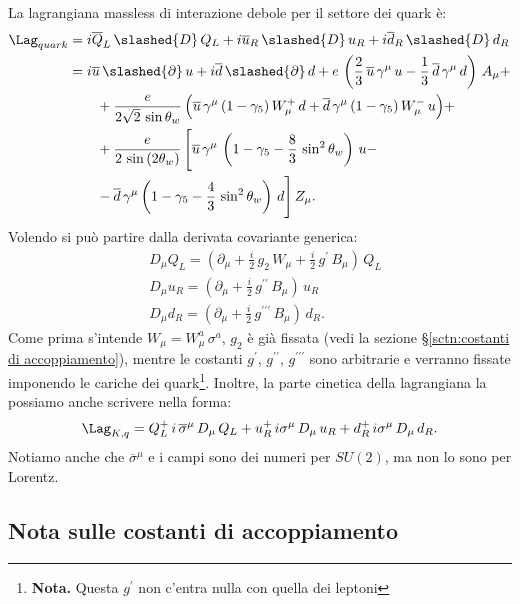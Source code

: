 La lagrangiana massless di interazione debole per il settore dei quark è:
\begin{align}
    \Lag_{quark} &= i\overline{Q}_L\, \slashed{D}\, Q_L + i\overline{u}_R\, \slashed{D}\, u_R + i\overline{d}_R\, \slashed{D}\, d_R \\
    &= i\overline{u}\, \slashed{\partial}\, u + i\overline{d}\, \slashed{\partial}\, d + e\, \left( \frac{2}{3}\, \overline{u}\, \gamma^\mu\, u - \frac{1}{3}\, \overline{d}\, \gamma^\mu\, d \right)\, A_\mu + \notag \\
    &\qquad + \frac{e}{2\sqrt{2}\, \sin\theta_w}\, \Big( \overline{u}\, \gamma^\mu\, (1-\gamma_5)\, W_\mu^+\, d + \overline{d}\, \gamma^\mu\, (1-\gamma_5)\, W_\mu^-\, u \Big) + \notag \\
    &\qquad + \frac{e}{2\, \sin{(2\theta_w)}}\, \Bigg[ \overline{u}\, \gamma^\mu\, \left( 1 - \gamma_5 - \frac{8}{3}\, \sin^2\theta_w \right)\, u - \notag \\
    &\qquad - \overline{d}\, \gamma^\mu\left( 1 - \gamma_5 - \frac{4}{3}\, \sin^2\theta_w\right)\, d \Bigg]\, Z_\mu.
\end{align}
Volendo si può partire dalla derivata covariante generica:
\begin{align}
    &D_\mu Q_L = \left( \partial_\mu + \frac{i}{2}\, g_2\, W_\mu + \frac{i}{2}\, g^\prime\, B_\mu \right)\, Q_L \\
    &D_\mu u_R = \left( \partial_\mu + \frac{i}{2}\, g^{\prime\prime}\, B_\mu \right)\, u_R \\
    &D_\mu d_R = \left( \partial_\mu + \frac{i}{2}\, g^{\prime\prime\prime}\, B_\mu \right)\, d_R.
\end{align}
Come prima s'intende $W_\mu = W_\mu^a\, \sigma^a$, $g_2$ è già fissata (vedi la sezione \S\ref{sctn:costanti di accoppiamento}), mentre le costanti $g^\prime$, $g^{\prime\prime}$, $g^{\prime\prime\prime}$ sono arbitrarie e verranno fissate imponendo le cariche dei quark\footnote{\textbf{Nota.} Questa $g^\prime$ non c'entra nulla con quella dei leptoni}. Inoltre, la parte cinetica della lagrangiana la possiamo anche scrivere nella forma:
\begin{equation}
    \Lag_{K,q} = Q_L^+\, i\, \overline{\sigma}^\mu\, D_\mu\, Q_L + u_R^+\, i\sigma^\mu\, D_\mu\, u_R + d_R^+\, i\sigma^\mu\, D_\mu\, d_R.
\end{equation}
Notiamo anche che $\overline{\sigma}^\mu$ e i campi sono dei numeri per $SU(2)$, ma non lo sono per Lorentz.


\subsection{Nota sulle costanti di accoppiamento\label{sctn:costanti di accoppiamento}}

